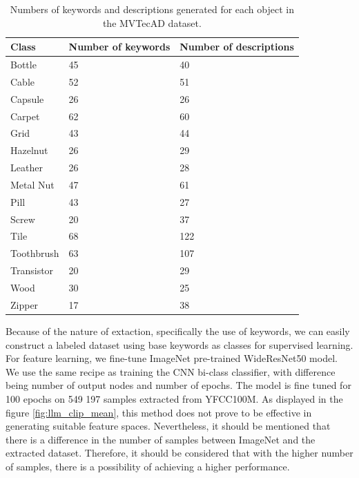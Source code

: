 \begin{table}[h]
\begin{center}
\begin{tabular}{lll}
\hline 
\textbf{Class} & \textbf{Number of keywords} & \textbf{Number of descriptions} \\
\hline\hline
Bottle & 45 & 40 \\
Cable & 52 & 51 \\
Capsule & 26 & 26 \\
Carpet & 62 & 60 \\
Grid & 43 & 44 \\
Hazelnut & 26 & 29 \\
Leather & 26 & 28 \\
Metal Nut & 47 & 61 \\
Pill & 43 & 27 \\
Screw & 20 & 37 \\
Tile & 68 & 122 \\
Toothbrush & 63 & 107 \\
Transistor & 20 & 29 \\
Wood & 30 & 25 \\
Zipper & 17 & 38 \\
\hline
\end{tabular}
\end{center}
\caption{Numbers of keywords and descriptions generated for each object in the MVTecAD dataset.}
\label{tab:gpt_keywords}
\end{table}

Because of the nature of extaction, specifically the use of keywords, we can easily construct a labeled dataset using base keywords as classes for supervised learning. For feature learning, we fine-tune ImageNet pre-trained WideResNet50 model. We use the same recipe as training the CNN bi-class classifier, with difference being number of output nodes and number of epochs. The model is fine tuned for 100 epochs on 549 197 samples extracted from YFCC100M. As displayed in the figure \ref{fig:llm_clip_mean}, this method does not prove to be effective in generating suitable feature spaces. Nevertheless, it should be mentioned that there is a difference in the number of samples between ImageNet and the extracted dataset. Therefore, it should be considered that with the higher number of samples, there is a possibility of achieving a higher performance.

